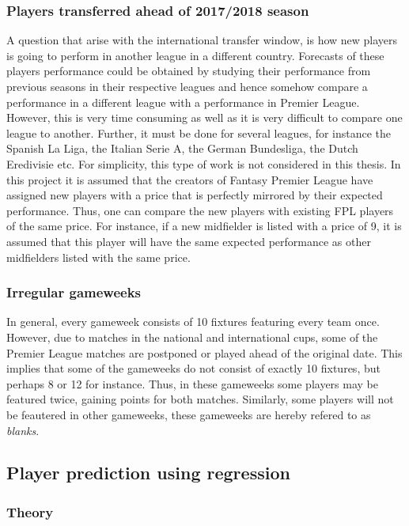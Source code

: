 \subsubsection{Players transferred ahead of 2017/2018 season}
A question that arise with the international transfer window, is how new players is going to perform in another league in a different country. Forecasts of these players performance could be obtained by studying their performance from previous seasons in their respective leagues and hence somehow compare a performance in a different league with a performance in Premier League. However, this is very time consuming as well as it is very difficult to compare one league to another. Further, it must be done for several leagues, for instance the Spanish La Liga, the Italian Serie A, the German Bundesliga, the Dutch Eredivisie etc. For simplicity, this type of work is not considered in this thesis.
\newpar
In this project it is assumed that the creators of Fantasy Premier League have assigned new players with a price that is perfectly mirrored by their expected performance. Thus, one can compare the new players with existing FPL players of the same price. For instance, if a new midfielder is listed with a price of 9, it is assumed that this player will have the same expected performance as other midfielders listed with the same price.
\subsubsection{Irregular gameweeks}
In general, every gameweek consists of 10 fixtures featuring every team once. However, due to matches in the national and international cups, some of the Premier League matches are postponed or played ahead of the original date. This implies that some of the gameweeks do not consist of exactly 10 fixtures, but perhaps 8 or 12 for instance. Thus, in these gameweeks some players may be featured twice, gaining points for both matches. Similarly, some players will not be feautered in other gameweeks, these gameweeks are hereby refered to as \textit{blanks}.



\subsection{Player prediction using regression}

\subsubsection{Theory}

